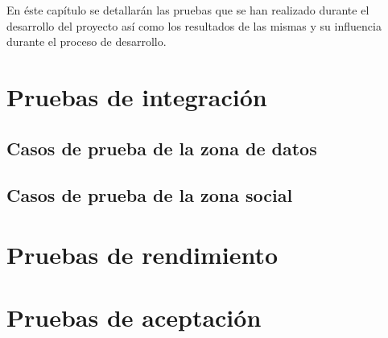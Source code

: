 En éste capítulo se detallarán las pruebas que se han realizado durante el desarrollo del proyecto así como los resultados de las mismas y su influencia durante el proceso de desarrollo.


\section{Pruebas de integración}
\label{pruebas:integracion}
	
	
	\subsection{Casos de prueba de la zona de datos}
	\label{pruebas:integracion:zona_datos}
	
	
	
	\subsection{Casos de prueba de la zona social}
	\label{pruebas:integracion:zona_social}
	


\section{Pruebas de rendimiento}
\label{pruebas:rendimiento}



\section{Pruebas de aceptación}
\label{pruebas:aceptacion}
